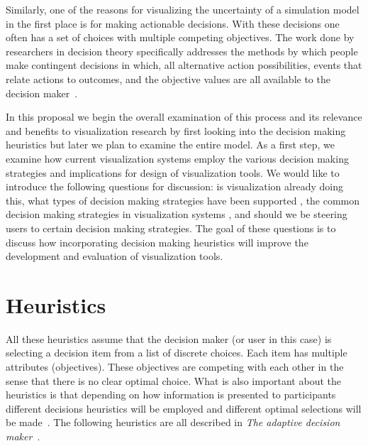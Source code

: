 Similarly, one of the reasons for visualizing the uncertainty of a simulation
model in the first place is for making actionable decisions. With these
decisions one often has a set of choices with multiple competing objectives.
The work done by researchers in decision theory specifically addresses the
methods by which people make contingent decisions in which, all alternative
action possibilities, events that relate actions to outcomes, and the objective
values are all available to the decision maker~\citep{Payne:1993}.  

In this proposal we begin the overall examination of this process  and its
relevance and benefits to visualization research by first looking into the
decision making heuristics but later we plan to examine the entire model.   As a
first step, we examine how current visualization systems employ the 
various decision making strategies
and implications for design of visualization
tools.  We would like to introduce the
following questions for discussion:  is visualization already doing this, what
types of decision making strategies have been supported , the common decision
making strategies in visualization systems , and should  we be steering users to
certain decision making strategies.
The goal of these questions is to discuss how incorporating decision making
heuristics will improve the development and evaluation of visualization tools.


\section{Heuristics}\label{heuristics}

All these heuristics assume that the decision maker (or user in this case)
is selecting a decision item from a list of discrete choices. Each item
has multiple attributes (objectives). These objectives are competing with
each other in the sense that there is no clear optimal choice. What is also
important about the heuristics is that depending on how information is 
presented to participants different decisions heuristics will be employed
and different optimal selections will be made~\citep{Jarvenpaa:1990}.
The following heuristics  are all described in \emph{The adaptive decision
maker}~\citep{Payne:1993}.

